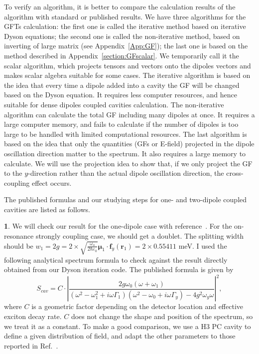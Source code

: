 To verify an algorithm, it is better to compare the calculation results of the algorithm with standard or published results. We have three algorithms for the GFTs calculation: the first one is called the iterative method based on iterative Dyson equations; the second one is called the non-iterative method, based on inverting of large matrix (see Appendix~\ref{App:GF}); the last one is based on the method described in Appendix~\ref{section:GFscalar}. We temporarily call it the scalar algorithm, which projects tensors and vectors onto the dipoles vectors and makes scalar algebra suitable for some cases. The iterative algorithm is based on the idea that every time a dipole added into a cavity the GF will be changed based on the Dyson equation. It requires less computer resources, and hence suitable for dense dipoles coupled cavities calculation. The non-iterative algorithm can calculate the total GF including many dipoles at once. It requires a large computer memory, and fails to calculate if the number of dipoles is too large to be handled with limited computational resources. The last algorithm is based on the idea that only the quantities (GFs or E-field) projected in the dipole oscillation direction matter to the spectrum. It also requires a large memory to calculate. We will use the projection idea to show that, if we only project the GF to the $y$-direction rather than the actual dipole oscillation direction, the cross-coupling effect occurs.
%

The published formulas and our studying steps for one- and two-dipole coupled cavities are listed as follows.

{\textbf 1.} We will check our result for the one-dipole case with reference~\cite{Hughes2009}. For the on-resonance strongly coupling case, we should get a doublet. The splitting width should be $w_1=2g=2\times\sqrt{\frac{\omega_o}{2\hbar \varepsilon_0}}\boldsymbol{\mu}_1\cdot \mathbf{f}_y(\mathbf{r}_1)=2\times0.55411$ meV. I used the following analytical spectrum formula to check against the result directly obtained from our Dyson iteration code. The published formula is given by~\cite{Hughes2009}
\begin{equation}
 S_{cav}=C\cdot \left| \frac{2g\omega_0(\omega+\omega_1)}{(\omega^2-\omega_1^2+i\omega \Gamma_1)(\omega^2-\omega_0+i\omega \Gamma_y)-4g^2\omega_y \omega} \right|^2,
\label{spec_1dot}
\end{equation}
where $C$ is a geometric factor depending on the detector location and effective exciton decay rate. $C$ does not change the shape and position of the spectrum, so we treat it as a constant. To make a good comparison, we use a H3 PC cavity to define a given distribution of field, and adapt the other parameters to those reported in Ref.~\cite{Hughes2009}.

